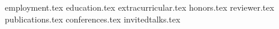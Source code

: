 \documentclass[11pt, a4paper]{awesome-cv}
\newcommand*{\sectiondir}{sections/}
\begin{document}
\makecvheader

{employment.tex}
{education.tex}
{extracurricular.tex}
{honors.tex}
\newpage
{reviewer.tex}
{publications.tex}
{conferences.tex}
{invitedtalks.tex}
\end{document}
